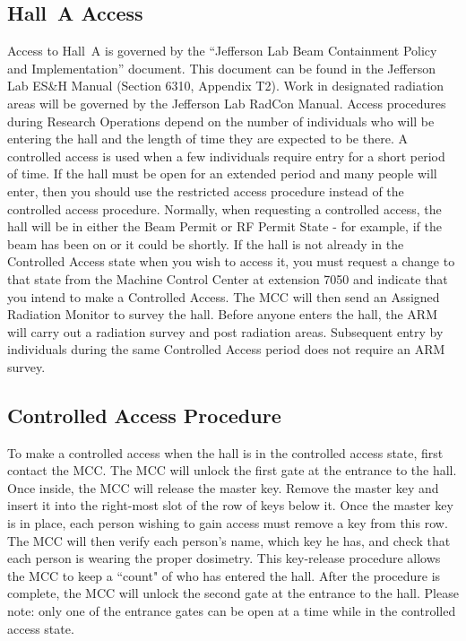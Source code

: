 \begin{safetyen}{10}{10}
\section{Hall~A Access} 
\end{safetyen}

Access to Hall~A is governed by the ``Jefferson Lab Beam Containment
Policy and Implementation'' document. This document can be found in
the Jefferson Lab ES\&H Manual (Section 6310, Appendix T2). Work in
designated radiation areas will be governed by the Jefferson Lab
RadCon Manual.  Access procedures during Research Operations depend on
the number of individuals who will be entering the hall and the length
of time they are expected to be there.  A controlled access is used
when a few individuals require entry for a short period of time. If
the hall must be open for an extended period and many people will
enter, then you should use the restricted access procedure instead of
the controlled access procedure.  Normally, when requesting a
controlled access, the hall will be in either the Beam Permit or RF
Permit State - for example, if the beam has been on or it could be
shortly.  If the hall is not already in the Controlled Access state
when you wish to access it, you must request a change to that state
from the Machine Control Center at extension 7050 and indicate that
you intend to make a Controlled Access. The MCC will then send an
Assigned Radiation Monitor to survey the hall. Before anyone enters
the hall, the ARM will carry out a radiation survey and post radiation
areas. Subsequent entry by individuals during the same Controlled
Access period does not require an ARM survey.

\begin{safetyen}{10}{10}
\subsection{Controlled Access Procedure} 
\end{safetyen}

To make a controlled access when the hall is in the controlled access
state, first contact the MCC. The MCC will unlock the first gate at
the entrance to the hall. Once inside, the MCC will release the master
key. Remove the master key and insert it into the right-most slot of
the row of keys below it. Once the master key is in place, each person
wishing to gain access must remove a key from this row. The MCC will
then verify each person's name, which key he has, and check that each
person is wearing the proper dosimetry. This key-release procedure
allows the MCC to keep a ``count" of who has entered the hall. After
the procedure is complete, the MCC will unlock the second gate at the
entrance to the hall. Please note: only one of the entrance gates can
be open at a time while in the controlled access state.
 
